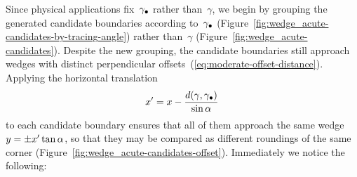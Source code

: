 Since physical applications fix~$\gamma_\bullet$ rather than~$\gamma$,
we begin by grouping the generated candidate boundaries
according to~$\gamma_\bullet$
(Figure~\ref{fig:wedge_acute-candidates-by-tracing-angle})
rather than~$\gamma$
(Figure~\ref{fig:wedge_acute-candidates}).
Despite the new grouping,
the candidate boundaries still approach wedges
with distinct perpendicular offsets~(\ref{eq:moderate-offset-distance}).
Applying the horizontal translation
\begin{equation}
  x' = x - \frac{d (\gamma, \gamma_\bullet)}{\sin\alpha}
  \label{eq:moderate-horizontal-translation}
\end{equation}
to each candidate boundary
ensures that all of them approach
the same wedge~$y = \pm x' \tan\alpha$,
so that they may be compared as different roundings
of the same corner
(Figure~\ref{fig:wedge_acute-candidates-offset}).
Immediately we notice the following:
